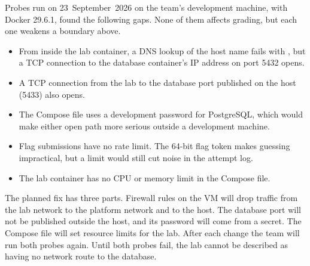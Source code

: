 Probes run on 23~September~2026 on the team's development machine, with Docker 29.6.1, found the following gaps. None of them affects grading, but each one weakens a boundary above.

\begin{itemize}[leftmargin=1.4em]
\item From inside the lab container, a DNS lookup of the host name  fails with , but a TCP connection to the database container's IP address on port 5432 opens.
\item A TCP connection from the lab to the database port published on the host (5433) also opens.
\item The Compose file uses a development password for PostgreSQL, which would make either open path more serious outside a development machine.
\item Flag submissions have no rate limit. The 64-bit flag token makes guessing impractical, but a limit would still cut noise in the attempt log.
\item The lab container has no CPU or memory limit in the Compose file.
\end{itemize}

The planned fix has three parts. Firewall rules on the VM will drop traffic from the lab network to the platform network and to the host. The database port will not be published outside the host, and its password will come from a secret. The Compose file will set resource limits for the lab. After each change the team will run both probes again. Until both probes fail, the lab cannot be described as having no network route to the database.
